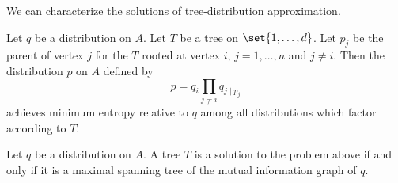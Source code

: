 We can characterize the solutions of tree-distribution approximation.


\begin{prop}

  Let $q$ be a distribution on $A$. Let $T$ be
  a tree on $\set{1, \dots, d}$. Let $p_j$ be
  the parent of vertex $j$ for the $T$ rooted
  at vertex $i$, $j = 1,\dots,n$ and $j \neq i$.
  Then the distribution $p$ on $A$ defined by
  \[
    p = q_i \prod_{j \neq i} q_{j \mid p_j}
  \]
  achieves minimum entropy relative to $q$ among
  all distributions which factor according to $T$.

\end{prop}

\begin{prop}

Let $q$ be a distribution on $A$.
A tree $T$ is a solution to the problem above if and only if it is a maximal spanning tree of the mutual information graph of $q$.

\end{prop}
\strats
